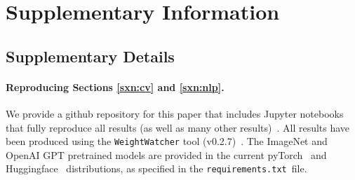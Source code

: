 \section{Supplementary Information}
\label{sxn:appendix}


\subsection{Supplementary Details} 

\paragraph{Reproducing Sections \ref{sxn:cv} and \ref{sxn:nlp}. }   

We provide a github repository for this paper that includes Jupyter notebooks that fully reproduce all results (as well as many other results)~\cite{kdd20_sub_repo}.
All results have been produced using the \texttt{WeightWatcher} tool (v0.2.7)~\cite{weightwatcher_package}.
The ImageNet and OpenAI GPT pretrained models are provided in the current 
pyTorch~\cite{pytorch} and Huggingface~\cite{huggingface} distributions, as specified in the \texttt{requirements.txt}~file. 

